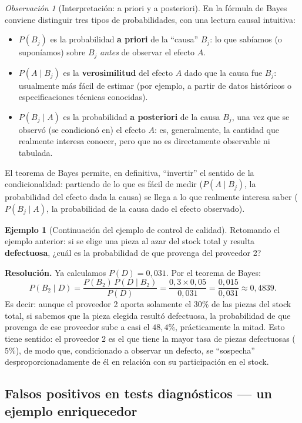 \documentclass[11pt,a4paper]{article}
\theoremstyle{plain}
\theoremstyle{definition}
\newtheorem{ejemplo}[teorema]{Ejemplo}
\theoremstyle{remark}
\newtheorem{observacion}[teorema]{Observación}
\begin{document}
\begin{observacion}[Interpretación: a priori y a posteriori]
En la fórmula de Bayes conviene distinguir tres tipos de probabilidades, con una lectura causal intuitiva:
\begin{itemize}
\item $P(B_j)$ es la probabilidad \textbf{a priori} de la ``causa'' $B_j$: lo que sabíamos (o suponíamos) sobre $B_j$ \emph{antes} de observar el efecto $A$.
\item $P(A\mid B_j)$ es la \textbf{verosimilitud} del efecto $A$ dado que la causa fue $B_j$: usualmente más fácil de estimar (por ejemplo, a partir de datos históricos o especificaciones técnicas conocidas).
\item $P(B_j\mid A)$ es la probabilidad \textbf{a posteriori} de la causa $B_j$, una vez que se observó (se condicionó en) el efecto $A$: es, generalmente, la cantidad que realmente interesa conocer, pero que no es directamente observable ni tabulada.
\end{itemize}
El teorema de Bayes permite, en definitiva, ``invertir'' el sentido de la condicionalidad: partiendo de lo que es fácil de medir ($P(A\mid B_j)$, la probabilidad del efecto dada la causa) se llega a lo que realmente interesa saber ($P(B_j\mid A)$, la probabilidad de la causa dado el efecto observado).
\end{observacion}

\begin{ejemplo}[Continuación del ejemplo de control de calidad]
Retomando el ejemplo anterior: si se elige una pieza al azar del stock total y resulta \textbf{defectuosa}, ¿cuál es la probabilidad de que provenga del proveedor 2?
\end{ejemplo}

\textbf{Resolución.} Ya calculamos $P(D) = 0{,}031$. Por el teorema de Bayes:
\[
P(B_2\mid D) = \frac{P(B_2)\,P(D\mid B_2)}{P(D)} = \frac{0{,}3 \times 0{,}05}{0{,}031} = \frac{0{,}015}{0{,}031} \approx 0{,}4839.
\]
Es decir: aunque el proveedor 2 aporta solamente el $30\%$ de las piezas del stock total, si sabemos que la pieza elegida resultó defectuosa, la probabilidad de que provenga de ese proveedor sube a casi el $48{,}4\%$, prácticamente la mitad. Esto tiene sentido: el proveedor 2 es el que tiene la mayor tasa de piezas defectuosas ($5\%$), de modo que, condicionado a observar un defecto, se ``sospecha'' desproporcionadamente de él en relación con su participación en el stock.

\subsection{Falsos positivos en tests diagnósticos — un ejemplo enriquecedor}
\end{document}
